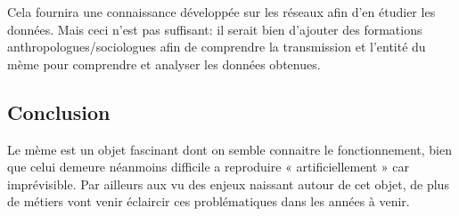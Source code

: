 \documentclass[12pt]{article}
\begin{document}
Cela fournira une connaissance développée sur les réseaux afin d'en étudier les données. Mais ceci n'est pas suffisant: il serait bien d'ajouter des formations anthropologues/sociologues afin de comprendre la transmission et l'entité du mème pour comprendre et analyser les données obtenues.

\subsection{Conclusion}
Le mème est un objet fascinant dont on semble connaitre le fonctionnement, bien que celui demeure néanmoins difficile a reproduire « artificiellement » car imprévisible. Par ailleurs aux vu des enjeux naissant autour de cet objet, de plus de métiers vont venir éclaircir ces problématiques dans les années à venir. 

\newpage


\end{document}
